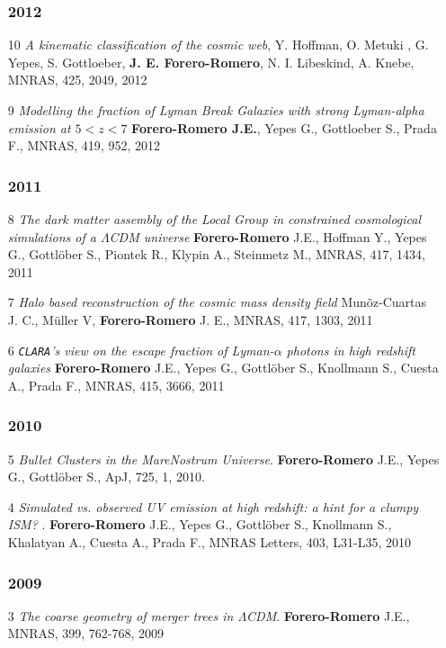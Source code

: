 \documentclass[a4paper,10pt]{article} %
\begin{document}
\begin{enumerate}
\subsubsection{2012}
\item[10] {\it A kinematic classification of the cosmic web},
  Y. Hoffman, O. Metuki , G. Yepes, S. Gottloeber, {\bf
    J. E. Forero-Romero}, N. I. Libeskind, A. Knebe, MNRAS, 425, 2049,
  2012 

\item[9] {\it Modelling the fraction of Lyman Break Galaxies with
  strong Lyman-alpha emission at $5 < z < 7$} {\bf Forero-Romero
  J.E.}, Yepes G., Gottloeber S., Prada F., MNRAS, 419, 952, 2012 

\subsubsection{2011}
\item [8]
{\it The dark matter assembly of the Local Group in constrained cosmological
  simulations of a $\Lambda$CDM universe} {\bf Forero-Romero} J.E.,
Hoffman Y., Yepes G., Gottl\"ober S., Piontek R., Klypin A., Steinmetz
M.,  MNRAS, 417, 1434, 2011 

\item[7] 
{\it Halo based reconstruction of the cosmic mass density field}
Mun\~oz-Cuartas J. C., M\"uller V, {\bf Forero-Romero} J. E.,
MNRAS, 417, 1303, 2011 
 
\item [6]
{\it {\tt CLARA}'s view on the escape fraction of Lyman-$\alpha$ photons in
  high redshift galaxies}
{\bf Forero-Romero} J.E., Yepes G., Gottl\"ober S., Knollmann S., Cuesta A., Prada F.,  
MNRAS, 415, 3666, 2011

\subsubsection{2010}
\item [5]
{\it Bullet Clusters in the MareNostrum Universe}. 
{\bf Forero-Romero} J.E., Yepes G., Gottl\"ober S., 
ApJ, 725, 1, 2010.

\item [4]
{\it Simulated vs. observed UV emission at high redshift: a hint for a clumpy
ISM? }. 
{\bf Forero-Romero} J.E., Yepes G., Gottl\"ober S., Knollmann S., Khalatyan A., Cuesta A., Prada F.,   MNRAS Letters, 403,  L31-L35, 2010

\subsubsection{2009}
\item [3]
{\it The coarse geometry of merger trees in
  $\Lambda$CDM}.  {\bf Forero-Romero} J.E., 
MNRAS, 399, 762-768, 2009


\end{enumerate}
\end{document}
